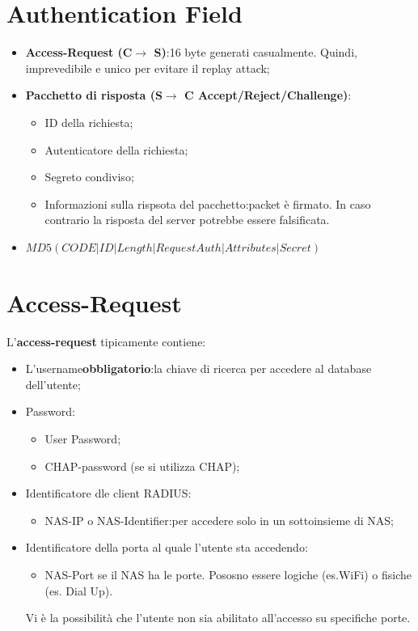 \documentclass{book}
\theoremstyle{remark}
\begin{document}
\section{Authentication Field}
\begin{itemize}
	\item \textbf{Access-Request (C\(\rightarrow\) S)}:\@16 byte generati casualmente\@. Quindi, imprevedibile e unico per evitare il replay attack;\@
	\item \textbf{Pacchetto di risposta (S\(\rightarrow\) C Accept/Reject/Challenge)}:\begin{itemize}
		      \item ID della richiesta;\@
		      \item Autenticatore della richiesta;\@
		      \item Segreto condiviso;\@
		      \item Informazioni sulla rispsota del pacchetto:\@response packet è firmato\@. In caso contrario la risposta del server potrebbe essere falsificata\@.
	      \end{itemize}
	\item \(MD5 (CODE|ID|Length|RequestAuth|Attributes|Secret)\)
\end{itemize}
\section{Access-Request}
L'\textbf{access-request} tipicamente contiene:\begin{itemize}
	\item L'username\textbf{obbligatorio}: la chiave di ricerca per accedere al database dell'utente;\@
	\item Password:\begin{itemize}
		      \item User Password;\@
		      \item CHAP-password (se si utilizza CHAP);\@
	      \end{itemize}
	\item Identificatore dle client RADIUS:\begin{itemize}
		      \item NAS-IP o NAS-Identifier:\@utile per accedere solo in un sottoinsieme di NAS;\@
	      \end{itemize}
	\item Identificatore della porta al quale l'utente sta accedendo:\begin{itemize}
		      \item NAS-Port se il NAS ha le porte\@. Pososno essere logiche (es\@.WiFi) o fisiche (es\@. Dial Up)\@.
	      \end{itemize}
	      Vi è la possibilità che l'utente non sia abilitato all'accesso su specifiche porte\@.
\end{itemize}
\end{document}
